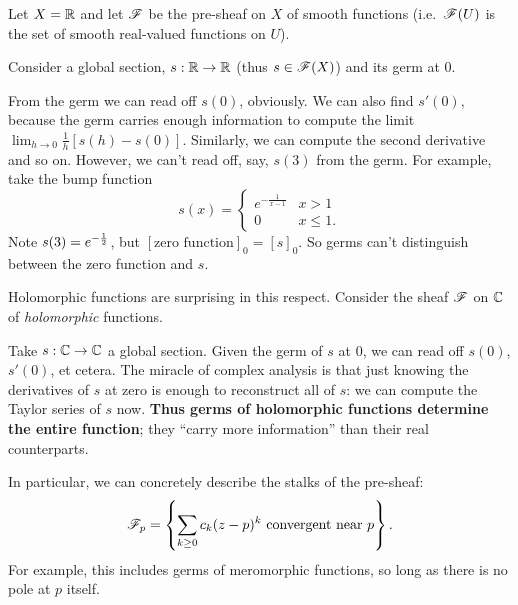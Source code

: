 \begin{example}
	Let $X = \mathbb R$ and let $\mathscr F$ be the pre-sheaf on $X$ of smooth functions
	(i.e.\ $\mathscr F(U)$ is the set of smooth real-valued functions on $U$).

	Consider a global section, $s : \mathbb R \to \mathbb R$ (thus $s \in \mathscr F(X)$)
	and its germ at $0$.
	\begin{enumerate}[(a)]
		\ii From the germ we can read off $s(0)$, obviously.
		\ii We can also find $s'(0)$, because the germ carries enough
		information to compute the limit $\lim_{h \to 0} \frac1h[s(h)-s(0)]$.
		\ii Similarly, we can compute the second derivative and so on.
		\ii However, we can't read off, say, $s(3)$ from the germ.
		For example, take the bump function
		\[
			s(x) = \begin{cases}
				e^{-\frac{1}{x-1}} & x > 1 \\
				0 & x \le 1.
			\end{cases}
		\]
		Note $s(3) = e^{-\frac{1}{2}}$, but $[\text{zero function}]_0 = [s]_0$.
		So germs can't distinguish between the zero function and $s$.
	\end{enumerate}
\end{example}

\begin{example}
	Holomorphic functions are surprising in this respect.
	Consider the sheaf $\mathscr F$ on $\mathbb C$ of \emph{holomorphic} functions.

	Take $s : \mathbb C \to \mathbb C$ a global section.
	Given the germ of $s$ at $0$, we can read off $s(0)$, $s'(0)$, et cetera.
	The miracle of complex analysis is that just knowing
	the derivatives of $s$ at zero is enough to reconstruct all of $s$:
	we can compute the Taylor series of $s$ now.
	\textbf{Thus germs of holomorphic functions determine the entire function};
	they ``carry more information'' than their real counterparts.
	
	In particular, we can concretely describe the stalks of the pre-sheaf:
	\[
		\mathscr F_p = \left\{
			\sum_{k \ge 0} c_k (z-p)^k
			\text{ convergent near $p$}
		\right\}.
	\]
	For example, this includes germs of meromorphic functions,
	so long as there is no pole at $p$ itself.
\end{example}

